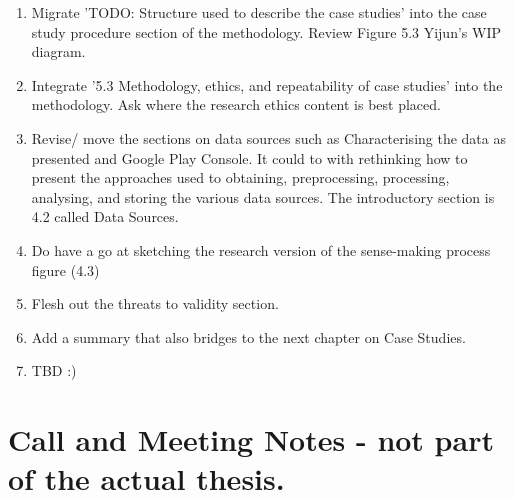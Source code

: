 \begin{enumerate}
    \item Migrate 'TODO: Structure used to describe the case studies' into the case study procedure section of the methodology. Review Figure 5.3 Yijun's WIP diagram.

    \item Integrate '5.3 Methodology, ethics, and repeatability of case studies' into the methodology. Ask where the research ethics content is best placed.

    \item Revise/ move the sections on data sources such as Characterising the data as presented and Google Play Console. It could to with rethinking how to present the approaches used to obtaining, preprocessing, processing, analysing, and storing the various data sources. The introductory section is 4.2 called Data Sources.

    \item Do have a go at sketching the research version of the sense-making process figure (4.3)

    \item Flesh out the threats to validity section.

    \item Add a summary that also bridges to the next chapter on Case Studies.

    \item TBD :)

\end{enumerate}

\clearpage
\section{Call and Meeting Notes - not part of the actual thesis.}

